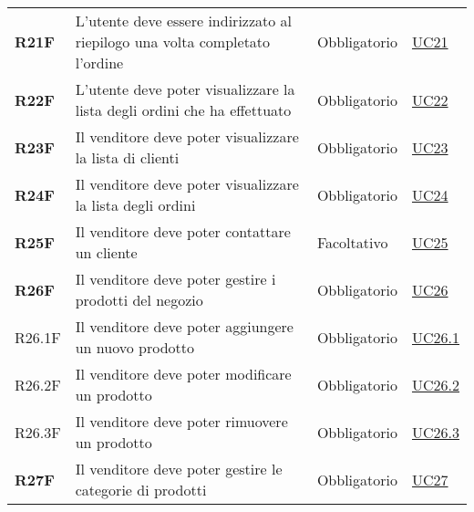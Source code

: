 \begin{center}
\begin{longtable}[!h]{p{50px} p{245px} p{75px} p{50px}}
        \textbf{R21F}                         & L'utente deve essere indirizzato al riepilogo una volta completato l'ordine                                & Obbligatorio             & \hyperref[sec:UC21]{UC21}                    \\
        \textbf{R22F}                         & L'utente deve poter visualizzare la lista degli ordini che ha effettuato                                   & Obbligatorio             & \hyperref[sec:UC22]{UC22}                    \\
        \textbf{R23F}                         & Il venditore deve poter visualizzare la lista di clienti                                                   & Obbligatorio             & \hyperref[sec:UC23]{UC23}                    \\
        \textbf{R24F}                         & Il venditore deve poter visualizzare la lista degli ordini                                                 & Obbligatorio             & \hyperref[sec:UC24]{UC24}                    \\
        \textbf{R25F}                         & Il venditore deve poter contattare un cliente                                                              & Facoltativo             & \hyperref[sec:UC25]{UC25}                    \\
        \textbf{R26F}                         & Il venditore deve poter gestire i prodotti del negozio                                                     & Obbligatorio             & \hyperref[sec:UC26]{UC26}                    \\
        R26.1F                                & Il venditore deve poter aggiungere un nuovo prodotto                                                       & Obbligatorio             & \hyperref[sec:UC26.1]{UC26.1}                \\
        R26.2F                                & Il venditore deve poter modificare un prodotto                                                             & Obbligatorio             & \hyperref[sec:UC26.2]{UC26.2}                \\
        R26.3F                                & Il venditore deve poter rimuovere un prodotto                                                              & Obbligatorio             & \hyperref[sec:UC26.3]{UC26.3}                \\
        \textbf{R27F}                         & Il venditore deve poter gestire le categorie di prodotti                                                   & Obbligatorio             & \hyperref[sec:UC27]{UC27}                    \\

\end{longtable}
\end{center}
